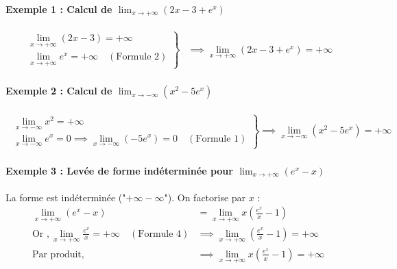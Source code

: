\documentclass[12pt,a4paper]{article}
\begin{document}
\vspace{0.4cm}

\begin{tcolorbox}[colback=gray!5!white,colframe=myblue,title=\textbf{Exemples d'application}]

\paragraph{Exemple 1 : Calcul de $\lim_{x \to +\infty} (2x - 3 + e^x)$}
\[
\begin{aligned}
\left.
\begin{array}{l}
\lim_{x \to +\infty} (2x - 3) = +\infty \\[2mm]
\lim_{x \to +\infty} e^x = +\infty \quad (\text{Formule 2})
\end{array}
\right\} 
&\implies \lim_{x \to +\infty} (2x - 3 + e^x) = +\infty
\end{aligned}
\]

\vspace{0.3cm}

\paragraph{Exemple 2 : Calcul de $\lim_{x \to -\infty} (x^2 - 5e^x)$}
\[
\begin{aligned}
\left.
\begin{array}{l}
\lim_{x \to -\infty} x^2 = +\infty \\[2mm]
\lim_{x \to -\infty} e^x = 0 \implies \lim_{x \to -\infty} (-5e^x) = 0 \quad (\text{Formule 1})
\end{array}
\right\} 
&\implies \lim_{x \to -\infty} (x^2 - 5e^x) = +\infty
\end{aligned}
\]

\vspace{0.3cm}

\paragraph{Exemple 3 : Levée de forme indéterminée pour $\lim_{x \to +\infty} (e^x - x)$}
La forme est indéterminée ("$+\infty - \infty$"). On factorise par $x$ :
\[
\begin{aligned}
\lim_{x \to +\infty} (e^x - x) &= \lim_{x \to +\infty} x \left(\frac{e^x}{x} - 1\right) \\[2mm]
\text{Or }, \lim_{x \to +\infty} \frac{e^x}{x} = +\infty \quad (\text{Formule 4}) &\implies \lim_{x \to +\infty} \left(\frac{e^x}{x} - 1\right) = +\infty \\[2mm]
\text{Par produit, } &\implies \lim_{x \to +\infty} x \left(\frac{e^x}{x} - 1\right) = +\infty
\end{aligned}
\]


\end{tcolorbox}
\end{document}
